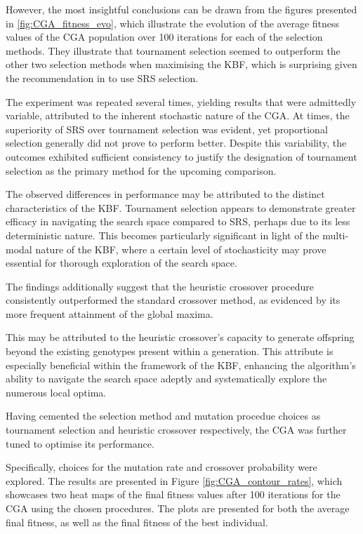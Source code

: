 \documentclass[10pt]{article}
\begin{document}
\begin{multicols}{2}
However, the most insightful conclusions can be drawn from the figures presented in \ref{fig:CGA_fitness_evo}, which illustrate the evolution of the average fitness values of the CGA population over 100 iterations for each of the selection methods. They illustrate that tournament selection seemed to outperform the other two selection methods when maximising the KBF, which is surprising given the recommendation in \cite{parks2023geneticalgorithms} to use SRS selection. 

The experiment was repeated several times, yielding results that were admittedly variable, attributed to the inherent stochastic nature of the CGA. At times, the superiority of SRS over tournament selection was evident, yet proportional selection generally did not prove to perform better. Despite this variability, the outcomes exhibited sufficient consistency to justify the designation of tournament selection as the primary method for the upcoming comparison.

The observed differences in performance may be attributed to the distinct characteristics of the KBF. Tournament selection appears to demonstrate greater efficacy in navigating the search space compared to SRS, perhaps due to its less deterministic nature. This becomes particularly significant in light of the multi-modal nature of the KBF, where a certain level of stochasticity may prove essential for thorough exploration of the search space.

The findings additionally suggest that the heuristic crossover procedure consistently outperformed the standard crossover method, as evidenced by its more frequent attainment of the global maxima. 

This may be attributed to the heuristic crossover's capacity to generate offspring beyond the existing genotypes present within a generation. This attribute is especially beneficial within the framework of the KBF, enhancing the algorithm's ability to navigate the search space adeptly and systematically explore the numerous local optima.

Having cemented the selection method and mutation procedue choices as tournament selection and heuristic crossover respectively, the CGA was further tuned to optimise its performance. 

Specifically, choices for the mutation rate and crossover probability were explored. The results are presented in Figure \ref{fig:CGA_contour_rates}, which showcases two heat maps of the final fitness values after 100 iterations for the CGA using the chosen procedures. The plots are presented for both the average final fitness, as well as the final fitness of the best individual.


\end{multicols}
\end{document}
